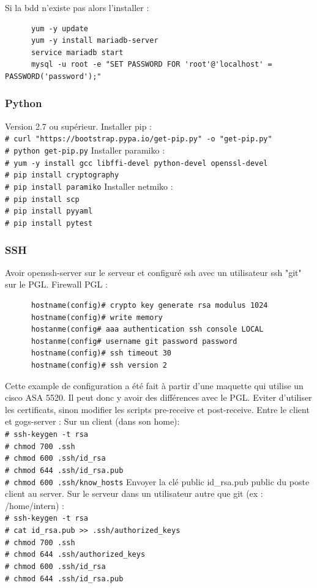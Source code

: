 \documentclass{article}
\newcommand{\shellcmdd}[1]{\\\indent\indent\texttt{\footnotesize\# #1}}
\begin{document}
      \noindent Si la bdd n'existe pas alors l'installer :
\begin{verbatim}
      yum -y update
      yum -y install mariadb-server
      service mariadb start
      mysql -u root -e "SET PASSWORD FOR 'root'@'localhost' = PASSWORD('password');"
\end{verbatim}

      \subsubsection{Python}

      \noindent Version 2.7 ou supérieur. \bigbreak
      \noindent Installer pip :
      \noindent\shellcmdd{curl "https://bootstrap.pypa.io/get-pip.py" -o "get-pip.py"}
      \noindent\shellcmdd{python get-pip.py} \smallbreak
      \noindent Installer paramiko :
      \noindent\shellcmdd{yum -y install gcc libffi-devel python-devel openssl-devel}
      \noindent\shellcmdd{pip install cryptography}
      \noindent\shellcmdd{pip install paramiko} \smallbreak
      \noindent Installer netmiko :
      \noindent\shellcmdd{pip install scp}
      \noindent\shellcmdd{pip install pyyaml}
      \noindent\shellcmdd{pip install pytest}

    \subsubsection{SSH}

      \noindent Avoir openssh-server sur le serveur et configuré ssh avec un utilisateur ssh "git" sur le PGL. \bigbreak
      \noindent Firewall PGL : \smallbreak
\begin{verbatim}
      hostname(config)# crypto key generate rsa modulus 1024
      hostname(config)# write memory
      hostanme(config# aaa authentication ssh console LOCAL
      hostanme(config# username git password password
      hostname(config)# ssh timeout 30
      hostname(config)# ssh version 2
\end{verbatim}
      \noindent Cette example de configuration a été fait à partir d'une maquette qui utilise un cisco ASA 5520.
      Il peut donc y avoir des différences avec le PGL. Eviter d'utiliser les certificats, sinon modifier les scripts
      pre-receive et post-receive.
      \noindent Entre le client et gogs-server : \bigbreak
      Sur un client (dans son home):
      \shellcmdd{ssh-keygen -t rsa}
      \shellcmdd{chmod 700 .ssh}
      \shellcmdd{chmod 600 .ssh/id\_rsa}
      \shellcmdd{chmod 644 .ssh/id\_rsa.pub}
      \shellcmdd{chmod 600 .ssh/know\_hosts} \smallbreak
      Envoyer la clé public id\_rsa.pub public du poste client au server. \bigbreak
      Sur le serveur dans un utilisateur autre que git (ex : /home/intern) :
      \shellcmdd{ssh-keygen -t rsa}
      \shellcmdd{cat id\_rsa.pub >> .ssh/authorized\_keys}
      \shellcmdd{chmod 700 .ssh}
      \shellcmdd{chmod 644 .ssh/authorized\_keys}
      \shellcmdd{chmod 600 .ssh/id\_rsa}
      \shellcmdd{chmod 644 .ssh/id\_rsa.pub} \smallbreak
\end{document}
